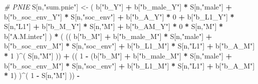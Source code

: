 \documentclass[
]{book}
\newenvironment{Shaded}{\begin{snugshade}}{\end{snugshade}}
\newcommand{\CommentTok}[1]{\textcolor[rgb]{0.56,0.35,0.01}{\textit{#1}}}
\newcommand{\DecValTok}[1]{\textcolor[rgb]{0.00,0.00,0.81}{#1}}
\newcommand{\NormalTok}[1]{#1}
\newcommand{\OtherTok}[1]{\textcolor[rgb]{0.56,0.35,0.01}{#1}}
\newcommand{\SpecialCharTok}[1]{\textcolor[rgb]{0.81,0.36,0.00}{\textbf{#1}}}
\newcommand{\StringTok}[1]{\textcolor[rgb]{0.31,0.60,0.02}{#1}}
\begin{document}
\begin{Shaded}
\begin{Highlighting}[]
    \CommentTok{\# PNIE }
\NormalTok{    S[n,}\StringTok{"sum.pnie"}\NormalTok{] }\OtherTok{\textless{}{-}}\NormalTok{ ( b[}\StringTok{"b\_Y"}\NormalTok{] }\SpecialCharTok{+} 
\NormalTok{                           b[}\StringTok{"b\_male\_Y"}\NormalTok{] }\SpecialCharTok{*}\NormalTok{ S[n,}\StringTok{"male"}\NormalTok{] }\SpecialCharTok{+} 
\NormalTok{                           b[}\StringTok{"b\_soc\_env\_Y"}\NormalTok{] }\SpecialCharTok{*}\NormalTok{ S[n,}\StringTok{"soc\_env"}\NormalTok{] }\SpecialCharTok{+} 
\NormalTok{                           b[}\StringTok{"b\_A\_Y"}\NormalTok{] }\SpecialCharTok{*} \DecValTok{0} \SpecialCharTok{+} 
\NormalTok{                           b[}\StringTok{"b\_L1\_Y"}\NormalTok{] }\SpecialCharTok{*}\NormalTok{ S[n,}\StringTok{"L1"}\NormalTok{] }\SpecialCharTok{+}
\NormalTok{                           b[}\StringTok{"b\_M\_Y"}\NormalTok{] }\SpecialCharTok{*}\NormalTok{ S[n,}\StringTok{"M"}\NormalTok{] }\SpecialCharTok{+}
\NormalTok{                           b[}\StringTok{"b\_AM\_Y"}\NormalTok{] }\SpecialCharTok{*} \DecValTok{0} \SpecialCharTok{*}\NormalTok{ S[n,}\StringTok{"M"}\NormalTok{] }\SpecialCharTok{*}\NormalTok{ b[}\StringTok{"A.M.inter"}\NormalTok{] ) }\SpecialCharTok{*}
\NormalTok{      ( (( b[}\StringTok{"b\_M"}\NormalTok{] }\SpecialCharTok{+} 
\NormalTok{             b[}\StringTok{"b\_male\_M"}\NormalTok{] }\SpecialCharTok{*}\NormalTok{ S[n,}\StringTok{"male"}\NormalTok{] }\SpecialCharTok{+} 
\NormalTok{             b[}\StringTok{"b\_soc\_env\_M"}\NormalTok{] }\SpecialCharTok{*}\NormalTok{ S[n,}\StringTok{"soc\_env"}\NormalTok{] }\SpecialCharTok{+} 
\NormalTok{             b[}\StringTok{"b\_L1\_M"}\NormalTok{] }\SpecialCharTok{*}\NormalTok{ S[n,}\StringTok{"L1"}\NormalTok{] }\SpecialCharTok{+}
\NormalTok{             b[}\StringTok{"b\_A\_M"}\NormalTok{] }\SpecialCharTok{*} \DecValTok{1}\NormalTok{ )}\SpecialCharTok{\^{}}\NormalTok{( S[n,}\StringTok{"M"}\NormalTok{] )) }\SpecialCharTok{+}
\NormalTok{          (( }\DecValTok{1} \SpecialCharTok{{-}}\NormalTok{ (b[}\StringTok{"b\_M"}\NormalTok{] }\SpecialCharTok{+} 
\NormalTok{                    b[}\StringTok{"b\_male\_M"}\NormalTok{] }\SpecialCharTok{*}\NormalTok{ S[n,}\StringTok{"male"}\NormalTok{] }\SpecialCharTok{+} 
\NormalTok{                    b[}\StringTok{"b\_soc\_env\_M"}\NormalTok{] }\SpecialCharTok{*}\NormalTok{ S[n,}\StringTok{"soc\_env"}\NormalTok{] }\SpecialCharTok{+} 
\NormalTok{                    b[}\StringTok{"b\_L1\_M"}\NormalTok{] }\SpecialCharTok{*}\NormalTok{ S[n,}\StringTok{"L1"}\NormalTok{] }\SpecialCharTok{+}
\NormalTok{                    b[}\StringTok{"b\_A\_M"}\NormalTok{] }\SpecialCharTok{*} \DecValTok{1}\NormalTok{) )}\SpecialCharTok{\^{}}\NormalTok{( }\DecValTok{1} \SpecialCharTok{{-}}\NormalTok{ S[n,}\StringTok{"M"}\NormalTok{] )) }\SpecialCharTok{{-}}

\end{Highlighting}
\end{Shaded}
\end{document}
